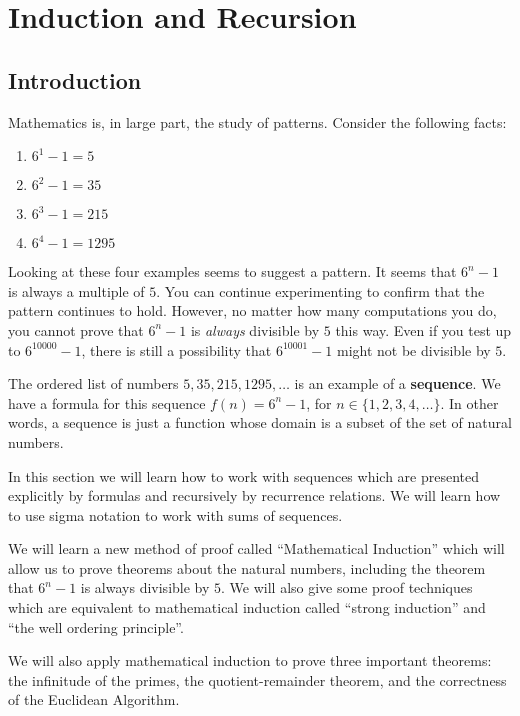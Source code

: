 \chapter{Induction and Recursion}

\section{Introduction}

Mathematics is, in large part, the study of patterns.  Consider the following facts:

\begin{enumerate}
		\item $6^1 - 1 = 5$
		\item $6^2 - 1 = 35$
		\item $6^3 -1 = 215$
		\item $6^4 - 1 = 1295$
	\end{enumerate}

Looking at these four examples seems to suggest a pattern.  It seems that $6^n - 1$ is always a multiple of $5$.  You can continue experimenting to confirm that the pattern continues to hold.  However, no matter how many computations you do, you cannot prove that $6^n-1$ is \textit{always} divisible by $5$ this way.  Even if you test up to $6^{10000} - 1$, there is still a possibility that $6^{10001} - 1$ might not be divisible by $5$.

The ordered list of numbers $5, 35, 215, 1295, \dots$ is an example of a \textbf{sequence}.  We have a formula for this sequence $f(n) = 6^n -1$, for $n \in \{1,2,3,4, \dots\}$.  In other words, a sequence is just a function whose domain is a subset of the set of natural numbers.

In this section we will learn how to work with sequences which are presented explicitly by formulas and recursively by recurrence relations.  We will learn how to use sigma notation to work with sums of sequences.

We will learn a new method of proof called ``Mathematical Induction'' which will allow us to prove theorems about the natural numbers, including the theorem that $6^n - 1$ is always divisible by $5$.    We will also give some proof techniques which are equivalent to mathematical induction called ``strong induction'' and ``the well ordering principle''.

We will also apply mathematical induction to prove three important theorems:  the infinitude of the primes,  the quotient-remainder theorem, and the correctness of the Euclidean Algorithm.

